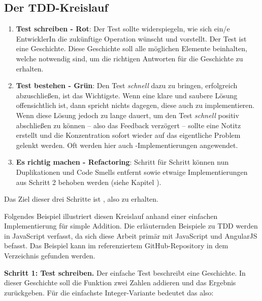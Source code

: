 \subsection{Der TDD-Kreislauf}
\begin{enumerate}
  \item \textbf{Test schreiben - Rot}:\newline
  Der Test sollte widerspiegeln, wie sich ein/e EntwicklerIn die zukünftige Operation wünscht und vorstellt. Der Test ist eine Geschichte. Diese Geschichte soll alle möglichen Elemente beinhalten, welche notwendig sind, um die richtigen Antworten für die Geschichte zu erhalten.
  \item \textbf{Test bestehen - Grün}:\newline
  Den Test \textit{schnell} dazu zu bringen, erfolgreich abzuschließen, ist das Wichtigste. Wenn eine klare und saubere Lösung offensichtlich ist, dann spricht nichts dagegen, diese auch zu implementieren. Wenn diese Lösung jedoch zu lange dauert, um den Test \textit{schnell} positiv abschließen zu können -- also das  Feedback verzögert -- sollte eine Notitz erstellt und die Konzentration sofort wieder auf das eigentliche Problem gelenkt werden. Oft werden hier auch -Implementierungen angewendet.
  \item \textbf{Es richtig machen - Refactoring}:\newline
  Schritt für Schritt können nun Duplikationen und Code Smells entfernt sowie etwaige  Implementierungen aus Schritt 2 behoben werden (siehe Kapitel ).
\end{enumerate}

Das Ziel dieser drei Schritte ist , also  zu erhalten.

Folgendes Beispiel illustriert diesen Kreislauf anhand einer einfachen Implementierung für simple Addition. Die erläuternden Beispiele zu TDD werden in JavaScript verfasst, da sich diese Arbeit primär mit JavaScript und AngularJS befasst. Das Beispiel kann im referenziertem GitHub-Repository in dem Verzeichnis  gefunden werden.

\vspace{0.5cm}
\textbf{Schritt 1: Test schreiben.}\newline
Der einfache Test beschreibt eine Geschichte. In dieser Geschichte soll die Funktion  zwei Zahlen addieren und das Ergebnis zurückgeben. Für die einfachste Integer-Variante bedeutet das also: 

